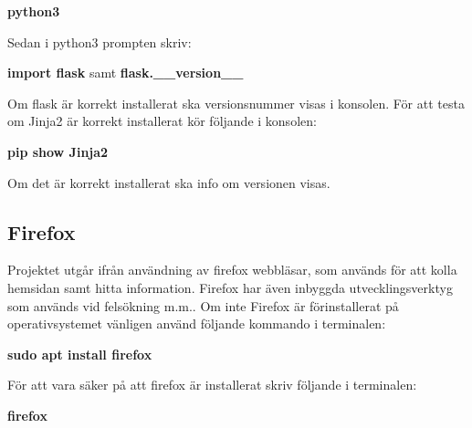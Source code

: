 \documentclass{TDP003mall}
\begin{document}
\textbf{python3}

Sedan i python3 prompten skriv:

\textbf{import flask} samt \textbf{flask.\_\_version\_\_}

Om flask är korrekt installerat ska versionsnummer visas i konsolen.
För att testa om Jinja2 är korrekt installerat kör följande i konsolen:

\textbf{pip show Jinja2}

Om det är korrekt installerat ska info om versionen visas.


\subsection{Firefox}
Projektet utgår ifrån användning av firefox webbläsar, som används för att kolla hemsidan samt hitta information. Firefox har även inbyggda utvecklingsverktyg som används vid felsökning m.m.. Om inte Firefox är förinstallerat på operativsystemet vänligen använd följande kommando i terminalen:

\textbf{sudo apt install firefox}

För att vara säker på att firefox är installerat skriv följande i terminalen:

\textbf{firefox}
\end{document}
